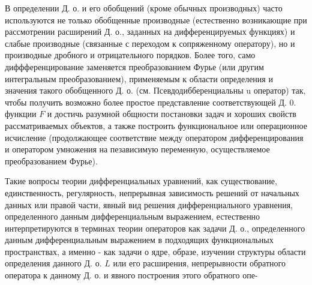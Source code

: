 \documentclass[10pt]{article}
\begin{document}
В определении Д. о. и его обобщений (кроме обычных производных) часто используются не только обобщенные производные (естественно возникающие при рассмотрении расширений Д. о., заданных на дифференцируемых функциях) и слабые производные (связанные с переходом к сопряженному оператору), но и производные дробного и отрицательного порядков. Более того, само диффференцирование заменяется преобразованием Фурье (или другим интегральным преобразованием), применяемым к области определения и значения такого обобщенного Д. о. (см. Псевдодибберенциальны u оператор) так, чтобы получить возможно более простое представление соответствующей Д. 0. функции $F$ и достичь разумной общности постановки задач и хороших свойств рассматриваемых объектов, а также построить функциональное или операционное исчисление (продолжающее соответствие между оператором дифференцирования и оператором умножения на пезависимую переменную, осуществляемое преобразованием Фурье).



Такие вопросы теории дифференциальных уравнений, как существование, единственность, регулярность, непрерывная зависимость решений от начальных данных или правой части, явный вид решения дифференциального уравнения, определенного данным дифференциальным выражением, естественно интерпретируются в терминах теории операторов как задачи Д. о., определенного данным дифференциальным выражением в подходящих функциональных пространствах, а именно - как задачи о ядре, образе, изучении структуры области определения данного Д. о. $L$ или его расширения, непрерывности обратного оператора к данному Д. о. и явного построения этого обратного опе-
\end{document}
